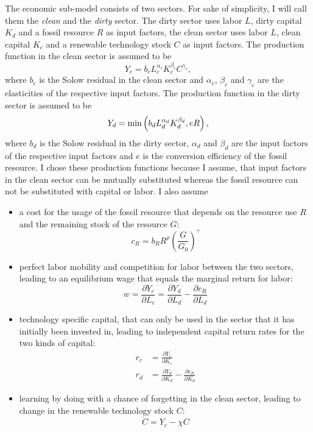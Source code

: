 The economic sub-model consists of two sectors. For sake of simplicity, I will call them the \textit{clean} and the \textit{dirty} sector. The dirty sector uses labor $L$, dirty capital $K_d$ and a fossil resource $R$ as input factors, the clean sector uses labor $L$, clean capital $K_c$ and a renewable technology stock $C$ as input factors. The production function in the clean sector is assumed to be
\begin{equation}
	Y_c = b_c L_c^{\alpha_c}K_c^{\beta_c}C^{\gamma_c}, 
	\label{clean_production}
\end{equation}
where $b_c$ is the Solow residual in the clean sector and $\alpha_c$, $\beta_c$ and $\gamma_c$ are the elasticities of the respective input factors.
The production function in the dirty sector is assumed to be
\begin{equation}
	Y_d = {\rm min}\left( b_d L_d^{\alpha_d}K_d^{\beta_d}, e R \right),
	\label{dirty_production}
\end{equation}
where $b_d$ is the Solow residual in the dirty sector, $\alpha_d$ and $\beta_d$ are the input factors of the respective input factors and $e$ is the conversion efficiency of the fossil resource. I chose these production functions because I assume, that input factors in the clean sector can be mutually substituted whereas the fossil resource can not be substituted with capital or labor.
I also assume
\begin{itemize}
	\item a cost for the usage of the fossil resource that depends on the resource use $R$ and the remaining stock of the resource $G$:
		\begin{equation}
			c_R = b_R R^{\rho}\left( \frac{G}{G_0} \right)^{\gamma}
			\label{resource cost}
		\end{equation}
	\item perfect labor mobility and competition for labor between the two sectors, leading to an equilibrium wage that equals the marginal return for labor:
		\begin{equation}
			w = \frac{\partial Y_c}{\partial L_c} = \frac{\partial Y_d}{\partial L_d} - \frac{\partial c_R}{\partial L_d}
			\label{equilibrium_wage}
		\end{equation}
	\item technology specific capital, that can only be used in the sector that it has initially been invested in, leading to independent capital return rates for the two kinds of capital:
		\begin{align}
			r_c &= \frac{\partial Y_c}{\partial K_c} \\
			r_d &= \frac{\partial Y_d}{\partial K_d} - \frac{\partial c_R}{\partial K_d}
		\end{align}
	\item learning by doing with a chance of forgetting in the clean sector, leading to change in the renewable technology stock $C$:
		\begin{equation}
			\dot{C} = Y_c - \chi C
			\label{learning_by_doing}
		\end{equation}
\end{itemize}

